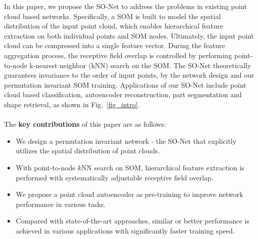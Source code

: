 \documentclass[10pt,twocolumn,letterpaper]{article}
\begin{document}
In this paper, we propose the SO-Net to address the problems in existing point cloud based networks. Specifically, a SOM \cite{kohonen1998self} is built to model the spatial distribution of the input point cloud, which enables hierarchical feature extraction on both individual points and SOM nodes. Ultimately, the input point cloud can be compressed into a single feature vector. During the feature aggregation process, the receptive field overlap is controlled by performing point-to-node k-nearest neighbor (kNN) search on the SOM. The SO-Net theoretically guarantees invariance to the order of input points, by the network design and our permutation invariant SOM training. Applications of our SO-Net include point cloud based classification, autoencoder reconstruction, part segmentation and shape retrieval, as shown in Fig.~\ref{fig_intro}.
\\\\
\noindent The \textbf{key contributions} of this paper are as follows:
\begin{itemize}
    \item We design a permutation invariant network - the SO-Net that explicitly utilizes the spatial distribution of point clouds. 
    \item With point-to-node $k$NN search on SOM, hierarchical feature extraction is performed with systematically adjustable receptive field overlap.
    \item We propose a point cloud autoencoder as pre-training to improve network performance in various tasks.
    \item Compared with state-of-the-art approaches, similar or better performance is achieved in various applications with significantly faster training speed.
\end{itemize}
\end{document}
